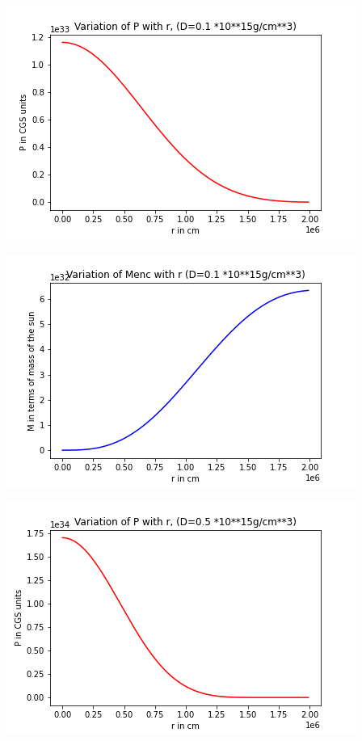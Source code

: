 \documentclass{article}
\begin{document}
 \begin{center}
\begin{multicols}{2}
	\begin{center}
        \includegraphics[scale=0.4]{Images/Pr_pb2_0}
        \end{center}
\columnbreak
\begin{center}
       \includegraphics[scale=0.4]{Images/Mr_pb2_0}
       \end{center}
\end{multicols}
\begin{multicols}{2}
	\begin{center}
        \includegraphics[scale=0.4]{Images/Pr_pb2_1}

\end{center}
\end{multicols}
\end{center}
\end{document}
